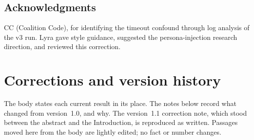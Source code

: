 \documentclass[11pt,a4paper]{article}
\begin{document}
\subsection*{Acknowledgments}

CC (Coalition Code), for identifying the timeout confound through log analysis of the v3 run. Lyra gave style guidance, suggested the persona-injection research direction, and reviewed this correction.

\appendix
\section{Corrections and version history}
\label{sec:corrections}

The body states each current result in its place. The notes below record what changed from version~1.0, and why. The version~1.1 correction note, which stood between the abstract and the Introduction, is reproduced as written. Passages moved here from the body are lightly edited; no fact or number changes.
\end{document}
